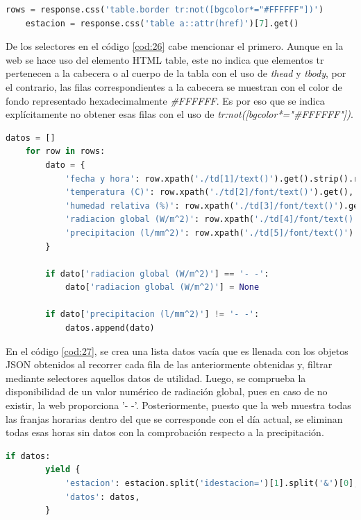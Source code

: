 \begin{lstlisting}[language=Python, caption={Selector en \textit{parse()} de MeteoNavarra Data Spider}, label=cod:26]
	rows = response.css('table.border tr:not([bgcolor*="#FFFFFF"])')
	estacion = response.css('table a::attr(href)')[7].get()
\end{lstlisting}

De los selectores en el código \ref{cod:26} cabe mencionar el primero. Aunque en la web se hace uso del elemento HTML table, este no indica que elementos tr pertenecen a la cabecera o al cuerpo de la tabla con el uso de \textit{thead} y \textit{tbody}, por el contrario, las filas correspondientes a la cabecera se muestran con el color de fondo representado hexadecimalmente \textit{\#FFFFFF}. Es por eso que se indica explícitamente no obtener esas filas con el uso de \textit{tr:not([bgcolor*="\#FFFFFF"])}.

\begin{lstlisting}[language=Python, caption={Trabajar sobre los datos de MeteoNavarra Data Spider}, label=cod:27]
	datos = []
	for row in rows:
		dato = {
			'fecha y hora': row.xpath('./td[1]/text()').get().strip().replace(' ', ' ') + ':00',
			'temperatura (C)': row.xpath('./td[2]/font/text()').get(),
			'humedad relativa (%)': row.xpath('./td[3]/font/text()').get(),
			'radiacion global (W/m^2)': row.xpath('./td[4]/font/text()').get(),
			'precipitacion (l/mm^2)': row.xpath('./td[5]/font/text()').get(),
		}
		
		if dato['radiacion global (W/m^2)'] == '- -':
			dato['radiacion global (W/m^2)'] = None
		
		if dato['precipitacion (l/mm^2)'] != '- -':
			datos.append(dato)
\end{lstlisting}

En el código \ref{cod:27}, se crea una lista datos vacía que es llenada con los objetos JSON obtenidos al recorrer cada fila de las anteriormente obtenidas y, filtrar mediante selectores aquellos datos de utilidad. Luego, se comprueba la disponibilidad de un valor numérico de radiación global, pues en caso de no existir, la web proporciona '- -'. Posteriormente, puesto que la web muestra todas las franjas horarias dentro del que se corresponde con el día actual, se eliminan todas esas horas sin datos con la comprobación respecto a la precipitación.

\begin{lstlisting}[language=Python, caption={Comprobacion exitencia de datos y guardado de MeteoNavarra Data Spider}, label=cod:28]
	if datos:
		yield {
			'estacion': estacion.split('idestacion=')[1].split('&')[0],
			'datos': datos,
		}
\end{lstlisting}

